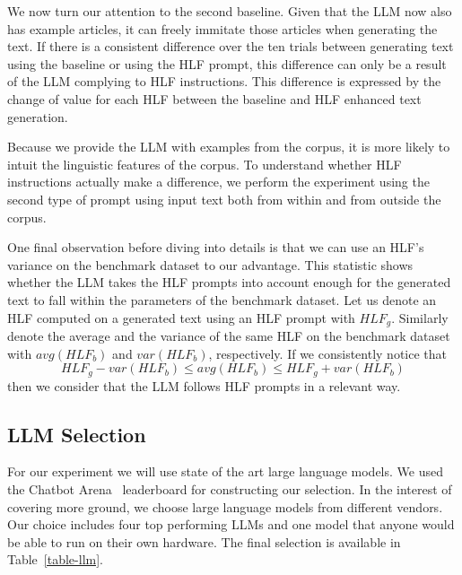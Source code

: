 \documentclass[runningheads,a4paper,11pt]{article}
\begin{document}
We now turn our attention to the second baseline.
Given that the LLM now also has example articles, it can freely immitate those
articles when generating the text.
If there is a consistent difference over the ten trials between generating text
using the baseline or using the HLF prompt, this difference can only be a result
of the LLM complying to HLF instructions.
This difference is expressed by the change of value for each HLF between the
baseline and HLF enhanced text generation.

Because we provide the LLM with examples from the corpus, it is more likely to
intuit the linguistic features of the corpus.
To understand whether HLF instructions actually make a difference, we perform
the experiment using the second type of prompt using input text both from within
and from outside the corpus.

One final observation before diving into details is that we can use an HLF's
variance on the benchmark dataset to our advantage.
This statistic shows whether the LLM takes the HLF prompts into account enough
for the generated text to fall within the parameters of the benchmark dataset.
Let us denote an HLF computed on a generated text using an HLF prompt with
$HLF_g$.
Similarly denote the average and the variance of the same HLF on the benchmark
dataset with $avg(HLF_b)$ and $var(HLF_b)$, respectively.
If we consistently notice that
\[HLF_g - var(HLF_b) \leq avg(HLF_b) \leq HLF_g + var(HLF_b)\]
then we consider that the LLM follows HLF prompts in a relevant way.

\subsection{LLM Selection}\label{llm-selection}

For our experiment we will use state of the art large language models.
We used the Chatbot Arena~\cite{chiang2024chatbot} leaderboard for constructing
our selection.
In the interest of covering more ground, we choose large language models from
different vendors.
Our choice includes four top performing LLMs and one model that anyone would be
able to run on their own hardware.
The final selection is available in Table~\ref{table-llm}.
\end{document}
